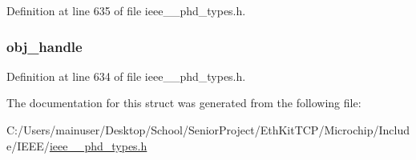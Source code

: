 Definition at line 635 of file ieee\+\_\+\_\+phd\+\_\+types.\+h.

\hypertarget{struct___get_result_simple_abbfff52b7a4956021522f5750c4b32c6}{}
\subsubsection[{obj\+\_\+handle}]{ obj\+\_\+handle}\label{struct___get_result_simple_abbfff52b7a4956021522f5750c4b32c6}


Definition at line 634 of file ieee\+\_\+\_\+phd\+\_\+types.\+h.



The documentation for this struct was generated from the following file\+:\begin{DoxyCompactItemize}
\item 
C\+:/\+Users/mainuser/\+Desktop/\+School/\+Senior\+Project/\+Eth\+Kit\+T\+C\+P/\+Microchip/\+Include/\+I\+E\+E\+E/\hyperlink{ieee__11073__phd__types_8h}{ieee\+\_\+\_\+phd\+\_\+types.\+h}\end{DoxyCompactItemize}
